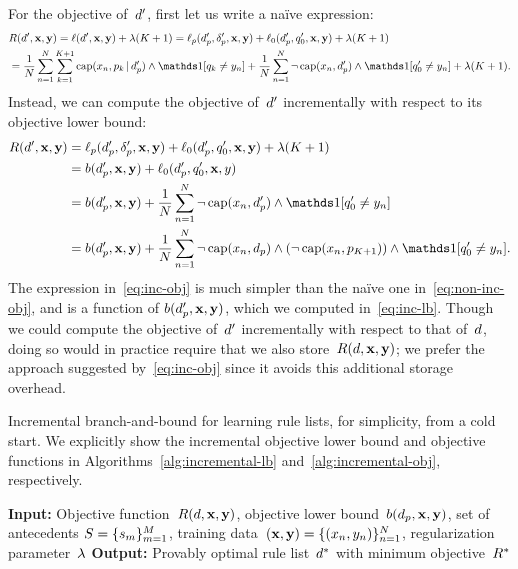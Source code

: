 \begin{arxiv}
%
For the objective of~${d}'$, first let us write a na\"ive expression:
\begin{align}
&\Obj(\RL', \x, \y) = \Loss(\RL', \x, \y) + \Reg (K + 1)
= \Loss_p(\Prefix', \Labels', \x, \y) + \Loss_0(\Prefix', \Default', \x, \y) + \Reg(K + 1) \nn \\
&= \frac{1}{N} \sum_{n=1}^N \sum_{k=1}^{K+1} \Cap(x_n, p_k \given \Prefix')
  \wedge \one [ q_k \neq y_n ] + \frac{1}{N}\sum_{n=1}^N \neg\, \Cap(x_n, \Prefix') \wedge
  \one [q'_0 \neq y_n] + \Reg (K+1). \label{eq:non-inc-obj}
\end{align}
Instead, we can compute the objective of~${d}'$ incrementally
with respect to its objective lower bound:
\begin{align}
\Obj(\RL', \x, \y) &=  \Loss_p(\Prefix', \Labels', \x, \y) +
  \Loss_0(\Prefix', \Default', \x, \y) + \Reg (K + 1) \nn \\
&= b(\Prefix', \x, \y) + \Loss_0(\Prefix', \Default', \x, y) \nn \\
&= b(\Prefix', \x, \y) + \frac{1}{N}\sum_{n=1}^N \neg\, \Cap(x_n, \Prefix') \wedge
  \one [q'_0 \neq y_n] \nn \\
&= b(\Prefix', \x, \y) + \frac{1}{N}\sum_{n=1}^N \neg\, \Cap(x_n, \Prefix) \wedge
  (\neg\, \Cap(x_n, p_{K+1})) \wedge \one [q'_0 \neq y_n].
\label{eq:inc-obj}
\end{align}
The expression in~\eqref{eq:inc-obj} is much simpler than the na\"ive
one in~\eqref{eq:non-inc-obj}, and is a function of
$b(d_p', \mathbf{x}, \mathbf{y})$, which we computed in~\eqref{eq:inc-lb}.
Though we could compute the objective of~${d}'$ incrementally
with respect to that of~${d}$, doing so would in practice require
that we also store~$R({d}, \mathbf{x}, \mathbf{y})$; we prefer the approach suggested
by~\eqref{eq:inc-obj} since it avoids this additional storage overhead.

\begin{algorithm}[t!]
  \caption{Incremental branch-and-bound for learning rule lists, for simplicity, from a cold start.
  We explicitly show the incremental objective lower bound and objective functions in Algorithms~\ref{alg:incremental-lb} and~\ref{alg:incremental-obj}, respectively.}
\label{alg:incremental}
\begin{algorithmic}
\normalsize
\State \textbf{Input:} Objective function~$R({d}, \mathbf{x}, \mathbf{y})$,
objective lower bound~${b(d_p, \mathbf{x}, \mathbf{y})}$,
set of antecedents ${S = \{s_m\}_{m=1}^M}$,
training data~$(\mathbf{x}, \mathbf{y}) = {\{(x_n, y_n)\}_{n=1}^N}$,
regularization parameter~${\lambda}$
\State \textbf{Output:} Provably optimal rule list~$d^*$ with minimum objective~$R^*$ \\


\end{algorithmic}
\end{algorithm}
\end{arxiv}
